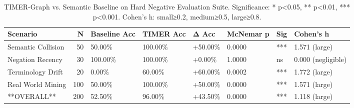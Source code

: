 \begin{table}
\caption{TIMER-Graph vs. Semantic Baseline on Hard Negative Evaluation Suite. Significance: * p<0.05, ** p<0.01, *** p<0.001. Cohen's h: small≥0.2, medium≥0.5, large≥0.8.}
\label{tab:timer_hard_negatives}
\begin{tabular}{lrllllll}
\toprule
Scenario & N & Baseline Acc & TIMER Acc & Δ Acc & McNemar p & Sig & Cohen's h \\
\midrule
Semantic Collision & 50 & 50.00\% & 100.00\% & +50.00\% & 0.0000 & *** & 1.571 (large) \\
Negation Recency & 30 & 100.00\% & 100.00\% & +0.00\% & 1.0000 & ns & 0.000 (negligible) \\
Terminology Drift & 20 & 0.00\% & 60.00\% & +60.00\% & 0.0002 & *** & 1.772 (large) \\
Real World Mining & 100 & 50.00\% & 100.00\% & +50.00\% & 0.0000 & *** & 1.571 (large) \\
**OVERALL** & 200 & 52.50\% & 96.00\% & +43.50\% & 0.0000 & *** & 1.118 (large) \\
\bottomrule
\end{tabular}
\end{table}

